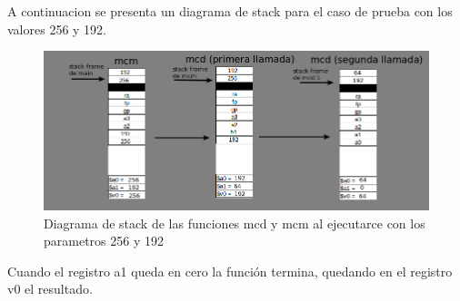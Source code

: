 \documentclass[a4paper,10pt]{article}
\begin{document}
    A continuacion se presenta un diagrama de stack para el caso de prueba con los valores 256 y 192.\\
    
    \begin{figure}[H]
        \centering
        \includegraphics[scale=0.6]{DS_mcm.png}
        \caption{Diagrama de stack de las funciones mcd y mcm al ejecutarce con los parametros 256 y 192}
        \label{fig:my_label}
    \end{figure}
    
    Cuando el registro a1 queda en cero la función termina, quedando en el registro v0 el resultado.\\
    
    
\end{document}
